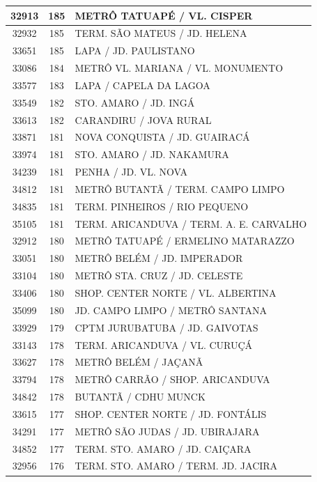 \documentclass[
	12pt,				%
	oneside,			%
	a4paper,			%
	english,			%
	brazil				%
	]{abntex2ppgsi}
\begin{document}
{{{\begin{apendicesenv}
\begin{longtable}{c|c|p{7cm}}
 \hline 
32913 &	185 &	METRÔ TATUAPÉ / VL. CISPER \\ 
 \hline 
32932 &	185 &	TERM. SÃO MATEUS / JD. HELENA \\ 
 \hline 
33651 &	185 &	LAPA / JD. PAULISTANO \\ 
 \hline 
33086 &	184 &	METRÔ VL. MARIANA / VL. MONUMENTO \\ 
 \hline 
33577 &	183 &	LAPA / CAPELA DA LAGOA \\ 
 \hline 
33549 &	182 &	STO. AMARO / JD. INGÁ \\ 
 \hline 
33613 &	182 &	CARANDIRU / JOVA RURAL \\ 
 \hline 
33871 &	181 &	NOVA CONQUISTA / JD. GUAIRACÁ \\ 
 \hline 
33974 &	181 &	STO. AMARO / JD. NAKAMURA \\ 
 \hline 
34239 &	181 &	PENHA / JD. VL. NOVA \\ 
 \hline 
34812 &	181 &	METRÔ BUTANTÃ / TERM. CAMPO LIMPO \\ 
 \hline 
34835 &	181 &	TERM. PINHEIROS / RIO PEQUENO \\ 
 \hline 
35105 &	181 &	TERM. ARICANDUVA / TERM. A. E. CARVALHO \\ 
 \hline 
32912 &	180 &	METRÔ TATUAPÉ / ERMELINO MATARAZZO \\ 
 \hline 
33051 &	180 &	METRÔ BELÉM / JD. IMPERADOR \\ 
 \hline 
33104 &	180 &	METRÔ STA. CRUZ / JD. CELESTE \\ 
 \hline 
33406 &	180 &	SHOP. CENTER NORTE / VL. ALBERTINA \\ 
 \hline 
35099 &	180 &	JD. CAMPO LIMPO / METRÔ SANTANA \\ 
 \hline 
33929 &	179 &	CPTM JURUBATUBA / JD. GAIVOTAS \\ 
 \hline 
33143 &	178 &	TERM. ARICANDUVA / VL. CURUÇÁ \\ 
 \hline 
33627 &	178 &	METRÔ BELÉM / JAÇANÃ \\ 
 \hline 
33794 &	178 &	METRÔ CARRÃO / SHOP. ARICANDUVA \\ 
 \hline 
34842 &	178 &	BUTANTÃ / CDHU MUNCK \\ 
 \hline 
33615 &	177 &	SHOP. CENTER NORTE / JD. FONTÁLIS \\ 
 \hline 
34291 &	177 &	METRÔ SÃO JUDAS / JD. UBIRAJARA \\ 
 \hline 
34852 &	177 &	TERM. STO. AMARO / JD. CAIÇARA \\ 
 \hline 
32956 &	176 &	TERM. STO. AMARO / TERM. JD. JACIRA \\ 
 \hline 

\end{longtable}
\end{apendicesenv}}}}
\end{document}

